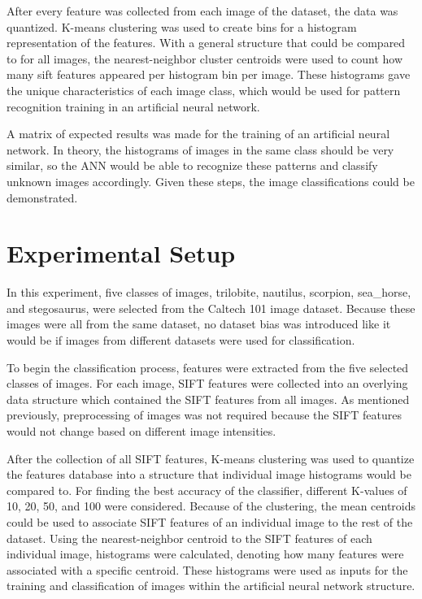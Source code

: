 \documentclass{article}
\begin{document}
After every feature was collected from each image of the dataset, the data was quantized. K-means clustering was used to create bins for a histogram representation of the features. With a general structure that could be compared to for all images, the nearest-neighbor cluster centroids were used to count how many sift features appeared per histogram bin per image. These histograms gave the unique characteristics of each image class, which would be used for pattern recognition training in an artificial neural network.

A matrix of expected results was made for the training of an artificial neural network. In theory, the histograms of images in the same class should be very similar, so the ANN would be able to recognize these patterns and classify unknown images accordingly. Given these steps, the image classifications could be demonstrated.
%
\section{Experimental Setup}
\label{sec:expsetup}

In this experiment, five classes of images, trilobite, nautilus, scorpion, sea\_horse, and stegosaurus, were selected from the Caltech 101 image dataset\cite{caltech101}. Because these images were all from the same dataset, no dataset bias was introduced like it would be if images from different datasets were used for classification. 

To begin the classification process, features were extracted from the five selected classes of images. For each image, SIFT features were collected into an overlying data structure which contained the SIFT features from all images. As mentioned previously, preprocessing of images was not required because the SIFT features would not change based on different image intensities.

After the collection of all SIFT features, K-means clustering was used to quantize the features database into a structure that individual image histograms would be compared to. For finding the best accuracy of the classifier, different K-values of 10, 20, 50, and 100 were considered. Because of the clustering, the mean centroids could be used to associate SIFT features of an individual image to the rest of the dataset. Using the nearest-neighbor centroid to the SIFT features of each individual image, histograms were calculated, denoting how many features were associated with a specific centroid. These histograms were used as inputs for the training and classification of images within the artificial neural network structure.
\end{document}
